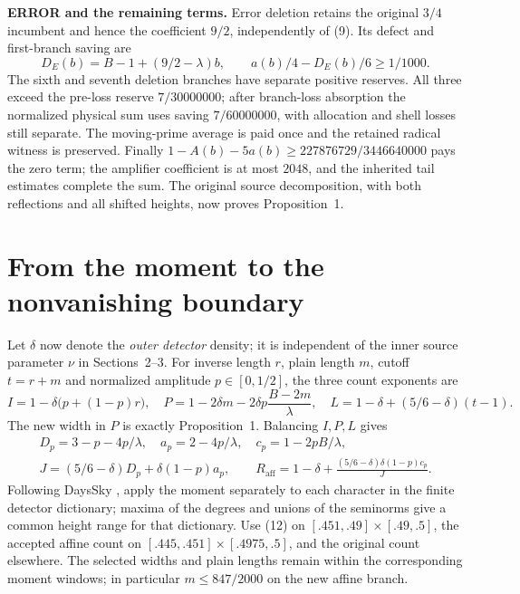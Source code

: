 \documentclass[10pt,a4paper]{article}
\newcommand{\Raff}{R_{\mathrm{aff}}}
\begin{document}
\textbf{ERROR and the remaining terms.} Error deletion retains the original
$3/4$ incumbent and hence the coefficient $9/2$, independently of (9).
Its defect and first-branch saving are
\[
 D_E(b)=B-1+(9/2-\lambda)b,\qquad
             a(b)/4-D_E(b)/6\ge1/1000.                 \tag{11}
\]
The sixth and seventh deletion branches have separate positive reserves.
All three exceed the pre-loss reserve $7/30000000$; after branch-loss
absorption the normalized physical sum uses saving $7/60000000$, with
allocation and shell losses still separate. The moving-prime average is
paid once and the retained radical witness is preserved.
Finally $1-A(b)-5a(b)\ge227876729/3446640000$ pays the zero term; the
amplifier coefficient is at most $2048$, and the inherited tail estimates
complete the sum. The original source decomposition, with both reflections
and all shifted heights, now proves Proposition~1.

\newpage
\section{From the moment to the nonvanishing boundary}
Let $\delta$ now denote the \emph{outer detector} density; it is independent
of the inner source parameter $\nu$ in Sections~2--3.
For inverse length $r$, plain length $m$, cutoff $t=r+m$ and normalized
amplitude $p\in[0,1/2]$, the three count exponents are
\[
 I=1-\delta\bigl(p+(1-p)r\bigr),\quad
 P=1-2\delta m-2\delta p\frac{B-2m}{\lambda},\quad
 L=1-\delta+(5/6-\delta)(t-1).
\]
The new width in $P$ is exactly Proposition~1. Balancing $I,P,L$ gives
\begin{gather*}
 D_p=3-p-4p/\lambda,\quad a_p=2-4p/\lambda,\quad c_p=1-2pB/\lambda,\\
 J=(5/6-\delta)D_p+\delta(1-p)a_p,\qquad
 \Raff=1-\delta+\frac{(5/6-\delta)\delta(1-p)c_p}{J}.      \tag{12}
\end{gather*}
Following DaysSky \cite{detector}, apply the moment separately to each
character in the finite detector dictionary; maxima of the degrees and
unions of the seminorms give a common height range for that dictionary.
Use (12) on $[.451,.49]\times[.49,.5]$, the accepted affine count on
$[.445,.451]\times[.4975,.5]$, and the original count elsewhere.
The selected widths and plain lengths remain within the corresponding
moment windows; in particular $m\le847/2000$ on the new affine branch.
\end{document}
